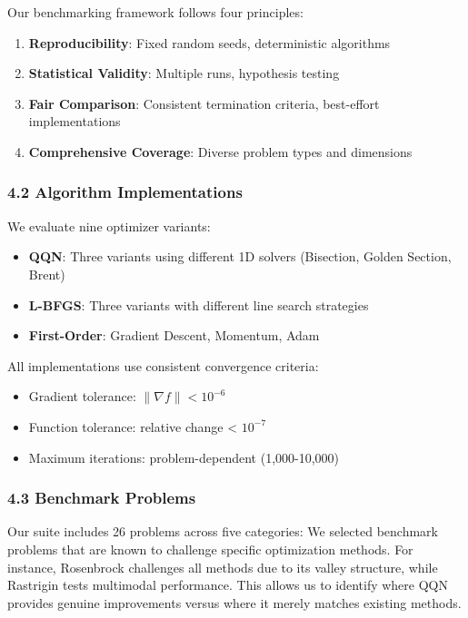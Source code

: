 Our benchmarking framework follows four principles:

\begin{enumerate}
\def\labelenumi{\arabic{enumi}.}
\tightlist
\item
  \textbf{Reproducibility}: Fixed random seeds, deterministic algorithms
\item
  \textbf{Statistical Validity}: Multiple runs, hypothesis testing
\item
  \textbf{Fair Comparison}: Consistent termination criteria, best-effort implementations
\item
  \textbf{Comprehensive Coverage}: Diverse problem types and dimensions
\end{enumerate}

\hypertarget{algorithm-implementations}{%
\subsubsection{4.2 Algorithm Implementations}\label{algorithm-implementations}}

We evaluate nine optimizer variants:

\begin{itemize}
\tightlist
\item
  \textbf{QQN}: Three variants using different 1D solvers (Bisection, Golden Section, Brent)
\item
  \textbf{L-BFGS}: Three variants with different line search strategies
\item
  \textbf{First-Order}: Gradient Descent, Momentum, Adam
\end{itemize}

All implementations use consistent convergence criteria:

\begin{itemize}
\tightlist
\item
  Gradient tolerance: \(\|\nabla f\| < 10^{-6}\)
\item
  Function tolerance: relative change \textless{} \(10^{-7}\)
\item
  Maximum iterations: problem-dependent (1,000-10,000)
\end{itemize}

\hypertarget{benchmark-problems}{%
\subsubsection{4.3 Benchmark Problems}\label{benchmark-problems}}

Our suite includes 26 problems across five categories:
We selected benchmark problems that are known to challenge specific optimization methods. For instance, Rosenbrock
challenges all methods due to its valley structure, while Rastrigin tests multimodal performance. This allows us to
identify where QQN provides genuine improvements versus where it merely matches existing methods.

